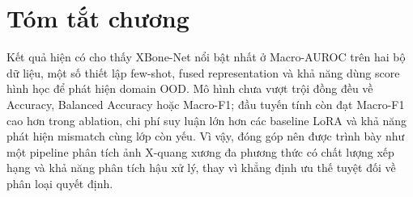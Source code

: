 \section{Tóm tắt chương}

Kết quả hiện có cho thấy XBone-Net nổi bật nhất ở Macro-AUROC trên hai bộ dữ liệu, một số thiết lập few-shot, fused representation và khả năng dùng score hình học để phát hiện domain OOD. Mô hình chưa vượt trội đồng đều về Accuracy, Balanced Accuracy hoặc Macro-F1; đầu tuyến tính còn đạt Macro-F1 cao hơn trong ablation, chi phí suy luận lớn hơn các baseline LoRA và khả năng phát hiện mismatch cùng lớp còn yếu. Vì vậy, đóng góp nên được trình bày như một pipeline phân tích ảnh X-quang xương đa phương thức có chất lượng xếp hạng và khả năng phân tích hậu xử lý, thay vì khẳng định ưu thế tuyệt đối về phân loại quyết định.
